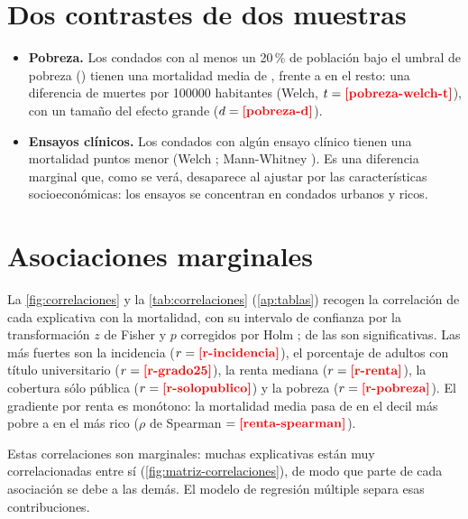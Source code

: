 



\section{Dos contrastes de dos muestras}

\begin{itemize}
  \item \textbf{Pobreza.} Los condados con al menos un 20\,\% de población bajo el umbral de
  pobreza () tienen una mortalidad media de , frente a
   en el resto: una diferencia de  muertes por
  \num{100000} habitantes  (Welch, $t=\res{pobreza-welch-t}$), con un tamaño
  del efecto grande ($d=\res{pobreza-d}$).
  \item \textbf{Ensayos clínicos.} Los  condados con algún ensayo clínico
  tienen una mortalidad  puntos menor (Welch ;
  Mann-Whitney ). Es una diferencia marginal que, como se verá, desaparece al
  ajustar por las características socioeconómicas: los ensayos se concentran en condados urbanos
  y ricos.
\end{itemize}

\section{Asociaciones marginales}

La \cref{fig:correlaciones} y la \cref{tab:correlaciones} (\cref{ap:tablas}) recogen la
correlación de cada explicativa con la mortalidad, con su intervalo de confianza por la
transformación $z$ de Fisher y $p$ corregidos por Holm \parencite{holm1979};  de
las  son significativas. Las más fuertes son la incidencia ($r=\res{r-incidencia}$), el
porcentaje de adultos con título universitario ($r=\res{r-grado25}$), la renta mediana
($r=\res{r-renta}$), la cobertura sólo pública ($r=\res{r-solopublico}$) y la pobreza
($r=\res{r-pobreza}$). El gradiente por renta es monótono: la mortalidad media pasa de
 en el decil más pobre a  en el más rico ($\rho$ de
Spearman $=\res{renta-spearman}$).


Estas correlaciones son marginales: muchas explicativas están muy correlacionadas entre sí
(\cref{fig:matriz-correlaciones}), de modo que parte de cada asociación se debe a las demás. El
modelo de regresión múltiple separa esas contribuciones.

